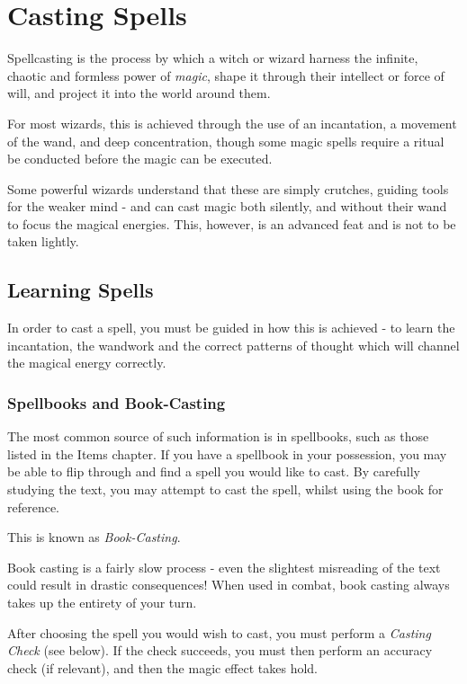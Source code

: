 



\chapter{Casting Spells}

Spellcasting is the process by which a witch or wizard harness the infinite, chaotic and formless power of {\it magic}, shape it through their intellect or force of will, and project it into the world around them. 

For most wizards, this is achieved through the use of an incantation, a movement of the wand, and deep concentration, though some magic spells require a ritual be conducted before the magic can be executed. 

Some powerful wizards understand that these are simply crutches, guiding tools for the weaker mind - and can cast magic both silently, and without their wand to focus the magical energies. This, however, is an advanced feat and is not to be taken lightly. 

\section{Learning Spells}

In order to cast a spell, you must be guided in how this is achieved - to learn the incantation, the wandwork and the correct patterns of thought which will channel the magical energy correctly. 

\subsection{Spellbooks and Book-Casting}

The most common source of such information is in spellbooks, such as those listed in the Items chapter. If you have a spellbook in your possession, you may be able to flip through and find a spell you would like to cast. By carefully studying the text, you may attempt to cast the spell, whilst using the book for reference. 

This is known as {\it Book-Casting}. 

Book casting is a fairly slow process - even the slightest misreading of the text could result in drastic consequences! When used in combat, book casting always takes up the entirety of your turn. 

After choosing the spell you would wish to cast, you must perform a {\it Casting Check} (see below). If the check succeeds, you must then perform an accuracy check (if relevant), and then the magic effect takes hold. 

